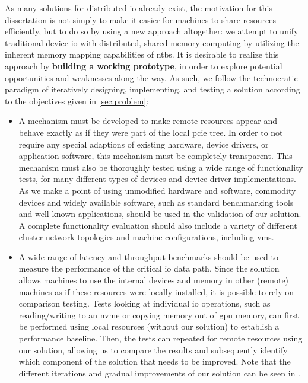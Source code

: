 As many solutions for distributed \gls{io} already exist, the motivation for this dissertation is not simply to make it easier for machines to share resources efficiently, but to do so by using a new approach altogether:
%
we attempt to unify traditional device \gls{io} with distributed, shared-memory computing by utilizing the inherent memory mapping capabilities of \glspl{ntb}.
%
It is desirable to realize this approach by \textbf{building a working prototype}, in order to explore potential opportunities and weaknesses along the way.
%
As such, we follow the technocratic paradigm of iteratively designing, implementing, and testing a solution according to the objectives given in \cref{sec:problem}:
%
\begin{itemize}
    \item 
        A mechanism must be developed to make remote resources appear and behave exactly as if they were part of the local \gls{pcie} tree.
        In order to not require any special adaptions of existing hardware, device drivers, or application software, this mechanism must be completely transparent.
        This mechanism must also be thoroughly tested using a wide range of functionality tests, for many different types of devices and device driver implementations.
        As we make a point of using unmodified hardware and software, commodity devices and widely available software, such as standard benchmarking tools and well-known applications, should be used in the validation of our solution.
        A complete functionality evaluation should also include a variety of different cluster network topologies and machine configurations, including \glspl{vm}.

    \item 
        A wide range of latency and throughput benchmarks should be used to measure the performance of the critical \gls{io} data path.
        Since the solution allows machines to use the internal devices and memory in other (remote) machines as if these resources were locally installed, it is possible to rely on comparison testing.
        Tests looking at individual \gls{io} operations, such as reading/writing to an \gls{nvme} or copying memory out of \gls{gpu} memory, can first be performed using local resources (without our solution) to establish a performance baseline.
        Then, the tests can repeated for remote resources using our solution, allowing us to compare the results and subsequently identify which component of the solution that needs to be improved.
        Note that the different iterations and gradual improvements of our solution can be seen in .


\end{itemize}

